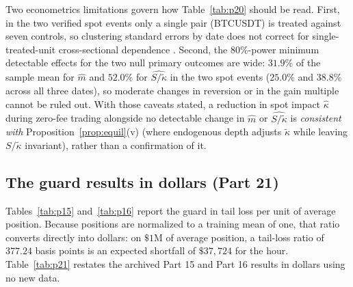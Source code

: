 Two econometrics limitations govern how Table~\ref{tab:p20} should be read. First, in the two verified spot events only a single pair (BTCUSDT) is treated against seven controls, so clustering standard errors by date does not correct for single-treated-unit cross-sectional dependence \citep{conley2011}. Second, the 80\%-power minimum detectable effects for the two null primary outcomes are wide: $31.9\%$ of the sample mean for $\hat m$ and $52.0\%$ for $\widehat{S/\tilde\kappa}$ in the two spot events ($25.0\%$ and $38.8\%$ across all three dates), so moderate changes in reversion or in the gain multiple cannot be ruled out. With those caveats stated, a reduction in spot impact $\hat\kappa$ during zero-fee trading alongside no detectable change in $\hat m$ or $\widehat{S/\tilde\kappa}$ is \emph{consistent with} Proposition~\ref{prop:equil}(v) (where endogenous depth adjusts $\tilde\kappa$ while leaving $S/\tilde\kappa$ invariant), rather than a confirmation of it.

\subsection{The guard results in dollars (Part 21)}\label{sec:p21}
Tables~\ref{tab:p15} and~\ref{tab:p16} report the guard in tail loss per unit of average position. Because positions are normalized to a training mean of one, that ratio converts directly into dollars: on $\$1$M of average position, a tail-loss ratio of $377.24$ basis points is an expected shortfall of $\$37{,}724$ for the hour. Table~\ref{tab:p21} restates the archived Part 15 and Part 16 results in dollars using no new data.

